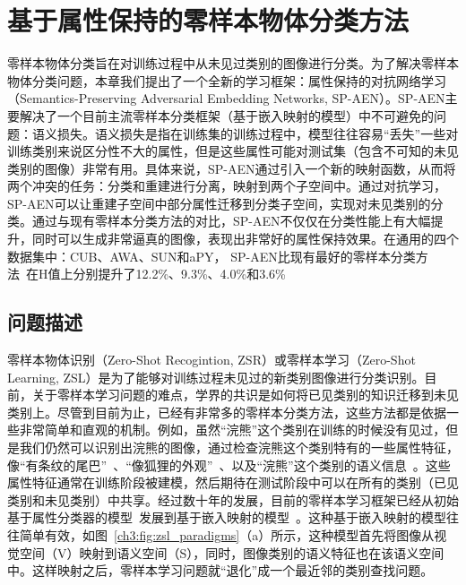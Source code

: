 \chapter{基于属性保持的零样本物体分类方法}


零样本物体分类旨在对训练过程中从未见过类别的图像进行分类。为了解决零样本物体分类问题，本章我们提出了一个全新的学习框架：属性保持的对抗网络学习（Semantics-Preserving Adversarial Embedding Networks, SP-AEN）。SP-AEN主要解决了一个目前主流零样本分类框架（基于嵌入映射的模型）中不可避免的问题：语义损失。语义损失是指在训练集的训练过程中，模型往往容易“丢失”一些对训练类别来说区分性不大的属性，但是这些属性可能对测试集（包含不可知的未见类别的图像）非常有用。具体来说，SP-AEN通过引入一个新的映射函数，从而将两个冲突的任务：分类和重建进行分离，映射到两个子空间中。通过对抗学习，SP-AEN可以让重建子空间中部分属性迁移到分类子空间，实现对未见类别的分类。通过与现有零样本分类方法的对比，SP-AEN不仅仅在分类性能上有大幅提升，同时可以生成非常逼真的图像，表现出非常好的属性保持效果。在通用的四个数据集中：CUB、AWA、SUN和aPY， SP-AEN比现有最好的零样本分类方法~\cite{xian2017zero}在H值上分别提升了12.2\%、9.3\%、4.0\%和3.6\%


\section{问题描述}


零样本物体识别（Zero-Shot Recogintion, ZSR）或零样本学习（Zero-Shot Learning, ZSL）是为了能够对训练过程未见过的新类别图像进行分类识别。目前，关于零样本学习问题的难点，学界的共识是如何将已见类别的知识迁移到未见类别上。尽管到目前为止，已经有非常多的零样本分类方法，这些方法都是依据一些非常简单和直观的机制。例如，虽然“浣熊”这个类别在训练的时候没有见过，但是我们仍然可以识别出浣熊的图像，通过检查浣熊这个类别特有的一些属性特征，像“有条纹的尾巴”~\cite{farhadi2009describing,lampert2009learning,zhang2013attribute,li2010object}、“像狐狸的外观”~\cite{torresani2010efficient,li2010object}、以及“浣熊”这个类别的语义信息~\cite{pennington2014glove,mikolov2013distributed}。这些属性特征通常在训练阶段被建模，然后期待在测试阶段中可以在所有的类别（已见类别和未见类别）中共享。经过数十年的发展，目前的零样本学习框架已经从初始基于属性分类器的模型~\cite{lampert2009learning}发展到基于嵌入映射的模型~\cite{akata2015label,frome2013devise,weston2010large}。这种基于嵌入映射的模型往往简单有效，如图~\ref{ch3:fig:zsl_paradigms}（a）所示，这种模型首先将图像从视觉空间（V）映射到语义空间（S），同时，图像类别的语义特征也在该语义空间中。这样映射之后，零样本学习问题就“退化”成一个最近邻的类别查找问题。

